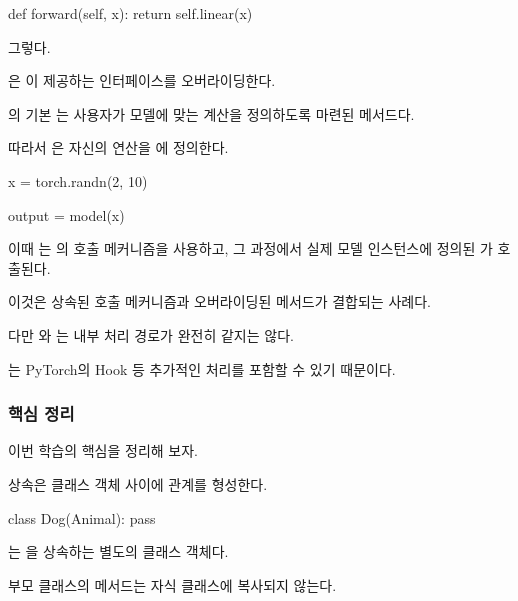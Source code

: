 \begin{dhkcode}
def forward(self, x):
    return self.linear(x)
\end{dhkcode}

그렇다.

은 이 제공하는  인터페이스를 오버라이딩한다.

의 기본 는 사용자가 모델에 맞는 계산을 정의하도록 마련된 메서드다.

따라서 은 자신의 연산을 에 정의한다.

\begin{dhkcode}
x = torch.randn(2, 10)

output = model(x)
\end{dhkcode}

이때 는 의 호출 메커니즘을 사용하고, 그 과정에서 실제 모델 인스턴스에 정의된 가 호출된다.

이것은 상속된 호출 메커니즘과 오버라이딩된 메서드가 결합되는 사례다.

다만 와 는 내부 처리 경로가 완전히 같지는 않다.

는 PyTorch의 Hook 등 추가적인 처리를 포함할 수 있기 때문이다.

\subsubsection{핵심 정리}

이번 학습의 핵심을 정리해 보자.

\begin{dhknote}
\begin{dhksmry}[centered]
상속은 클래스 객체 사이에 관계를 형성한다.
\end{dhksmry}
\end{dhknote}

\begin{dhkcode}
class Dog(Animal):
    pass
\end{dhkcode}

는 을 상속하는 별도의 클래스 객체다.

\begin{dhknote}
\begin{dhksmry}[centered]
부모 클래스의 메서드는 자식 클래스에 복사되지 않는다.
\end{dhksmry}
\end{dhknote}

